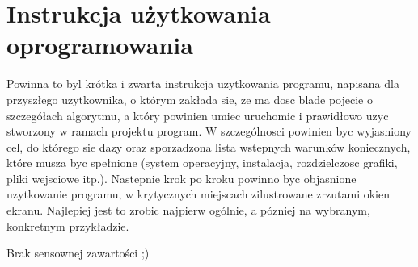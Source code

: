 \chapter{Instrukcja użytkowania oprogramowania}

Powinna to byl krótka i zwarta instrukcja uzytkowania programu, napisana dla przyszłego uzytkownika, o którym zakłada sie, ze ma dosc blade pojecie o szczegółach algorytmu, a który powinien umiec uruchomic i prawidłowo uzyc stworzony w ramach projektu program. W szczególnosci powinien byc wyjasniony cel, do którego sie dazy oraz sporzadzona lista
wstepnych warunków koniecznych, które musza byc spełnione (system operacyjny, instalacja, rozdzielczosc grafiki, pliki wejsciowe itp.). Nastepnie krok po kroku powinno byc objasnione uzytkowanie programu, w krytycznych miejscach zilustrowane zrzutami okien ekranu. Najlepiej jest to zrobic najpierw ogólnie, a pózniej na wybranym, konkretnym przykładzie.


Brak sensownej zawartości ;)


